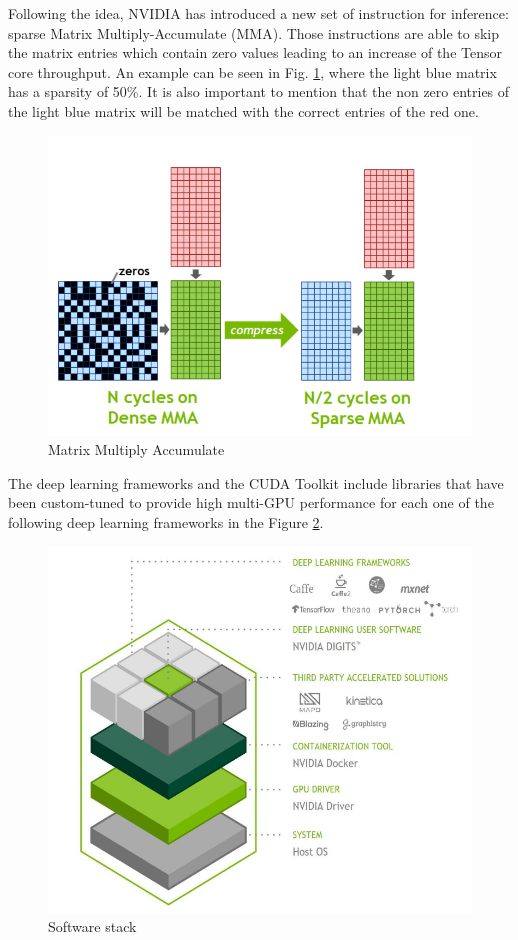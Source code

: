 Following the idea, NVIDIA has introduced a new set of instruction for inference: sparse Matrix Multiply-Accumulate (MMA). Those instructions are able to skip the matrix entries which contain zero values leading to an increase of the Tensor core throughput. An example can be seen in Fig. \ref{fig:mma}, where the light blue matrix has a sparsity of 50\%. It is also important to mention that the non zero entries of the light blue matrix will be matched with the correct entries of the red one.
\begin{figure}[!htbp]
\centering
\captionsetup{justification=centering}
\includegraphics[scale=0.35]{./figure/mma.png}
\caption{Matrix Multiply Accumulate\cite{paper:41}}
\label{fig:mma}
\end{figure}

\newpage
The deep learning frameworks and the CUDA Toolkit include libraries that have been custom-tuned to provide high multi-GPU performance for each one of the following deep learning frameworks in the Figure \ref{fig:swtesla}.

\begin{figure}[!htbp]
\centering
\captionsetup{justification=centering}
\includegraphics[scale=0.6]{./figure/sw_stack_tesla.PNG}
\caption{Software stack\cite{paper:41}}
\label{fig:swtesla}
\end{figure}

